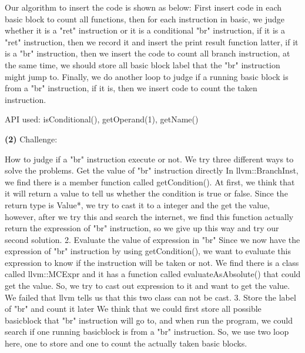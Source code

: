 \documentclass{article}
\renewcommand{\part}[1] {\vspace{.10in} {\bf (#1)}}
\begin{document}
Our algorithm to insert the code is shown as below: First insert code in each basic block to count all functions, then for each instruction in basic, we judge whether it is a {"ret"} instruction or it is a conditional {"br"} instruction, if it is a {"ret"} instruction, then we record it and insert the print result function latter, if it is a {"br"} instruction, then we insert the code to count all branch instruction, at the same time, we should store all basic block label that the {"br"} instruction might jump to. Finally, we do another loop to judge if a running basic block is from a {"br"} instruction, if it is, then we insert code to count the taken instruction.



API used:
isConditional(),
getOperand(1),
getName()


\part{2} Challenge:

How to judge if a {"br"} instruction execute or not.
We try three different ways to solve the problems.
	 Get the value of {"br"} instruction directly
		In llvm::BranchInst, we find there is a member function called getCondition(). At first, we think that it will return a value to tell us whether the condition is true or false. Since the return type is Value*, we try to cast it to a integer and the get the value, however, after we try this and search the internet, we find this function actually return the expression of {"br"} instruction, so we give up this way and try our second solution.
	2. Evaluate the value of expression in {"br"}
		Since we now have the expression of {"br"}  instruction by using getCondition(), we want to evaluate this expression to know if the instruction will be taken or not. We find there is a class called llvm::MCExpr and it has a function called evaluateAsAbsolute() that could get the value. So, we try to cast out expression to it and want to get the value. We failed that llvm tells us that this two class can not be cast.
	3. Store the label of {"br"} and count it later
		We think that we could first store all possible basicblock that {"br"} instruction will go to, and when run the program, we could search if one running basicblock is from a {"br"} instruction. So, we use two loop here, one to store and one to count the actually taken basic blocks.
\end{document}
